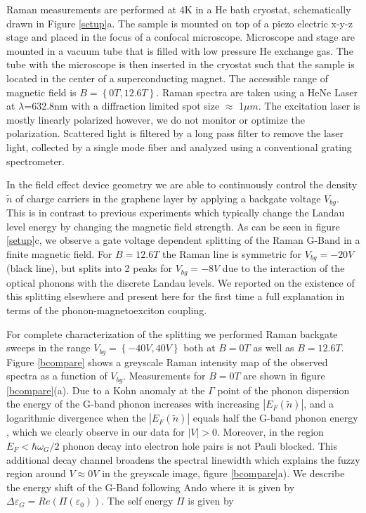 \documentclass[prl,aps,superscriptaddress,showpacs,reprint]{revtex4-1}
\begin{document}
Raman measurements are performed at 4K in a He bath cryostat, schematically drawn in Figure \ref{setup}a. The sample is mounted on top of a piezo electric x-y-z stage and placed in the focus of a confocal microscope. Microscope and stage are mounted in a vacuum tube that is filled with low pressure He exchange gas. The tube with the microscope is then inserted in the cryostat such that the sample is located in the center of a superconducting magnet. The accessible range of magnetic field is $B=\left\lbrace 0T,12.6T \right\rbrace$.
Raman spectra are taken using a HeNe Laser at $\lambda$=632.8nm with a diffraction limited spot size $\approx$ 1$\mu m$. The excitation laser is mostly linearly polarized however, we do not monitor or optimize the polarization. Scattered light is filtered by a long pass filter to remove the laser light, collected by a single mode fiber and analyzed using a conventional grating spectrometer.

In the field effect device geometry we are able to continuously control the density $\widetilde{n}$ of charge carriers in the graphene layer by applying a backgate voltage $V_{bg}$. This is in contrast to previous experiments which typically change the Landau level energy by changing the magnetic field strength. As can be seen in figure \ref{setup}c, we observe a gate voltage dependent splitting of the Raman G-Band in a finite magnetic field. For $B=12.6T$ the Raman line is symmetric for $V_{bg}=-20V$ (black line), but splits into 2 peaks for $V_{bg}=-8V$ due to the interaction of the optical phonons with the discrete Landau levels. We reported on the existence of this splitting elsewhere \cite{kias2009} and present here for the first time a full explanation in terms of the phonon-magnetoexciton coupling.

For complete characterization of the splitting we performed Raman backgate sweeps in the range $V_{bg}=\left\lbrace -40V,40V \right\rbrace$ both at $B=0T$ as well as $B=12.6T$. Figure \ref{bcompare} shows a greyscale Raman intensity map of the observed spectra as a function of $V_{bg}$.
Measurements for $B=0T$ are shown in figure \ref{bcompare}(a). Due to a Kohn anomaly at the $\Gamma$ point of the phonon dispersion the energy of the G-band phonon increases with increasing $\left|E_F(\widetilde{n})\right|$, and a logarithmic divergence when the   $\left|E_F(\widetilde{n})\right|$  equals half the G-band phonon energy \cite{tsuneya2006anomaly,pisana2007breakdown,yan2007electric}, which we clearly observe in our data for $\left|V\right| > 0$. Moreover, in the region $E_F<\hbar \omega_G/2$ phonon decay into electron hole pairs is not Pauli blocked. This additional decay channel broadens the spectral linewidth which explains the fuzzy region around $V\approx 0V$ in the greyscale image, figure \ref{bcompare}a). We describe the energy shift of the G-Band following Ando \cite{tsuneya2006anomaly} where it is given by $\Delta \varepsilon_G=Re(\Pi(\varepsilon_0))$. The self energy $\Pi$ is given by
\end{document}
